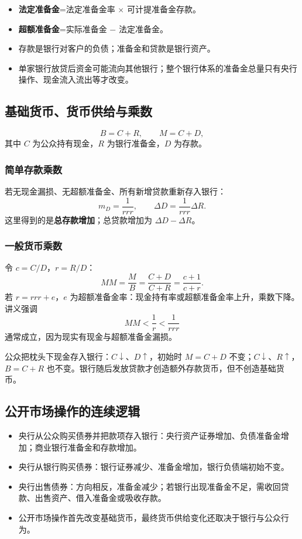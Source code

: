 \documentclass[UTF8,11pt,a4paper]{ctexart}
\newcommand{\term}[1]{\textbf{#1}}
\begin{document}
\begin{itemize}
  \item \term{法定准备金}=法定准备金率 $\times$ 可计提准备金存款。
  \item \term{超额准备金}=实际准备金 $-$ 法定准备金。
  \item 存款是银行对客户的负债；准备金和贷款是银行资产。
  \item 单家银行放贷后资金可能流向其他银行；整个银行体系的准备金总量只有央行操作、现金流入流出等才改变。
\end{itemize}

\subsection{基础货币、货币供给与乘数}
\[
B=C+R,
\qquad
M=C+D,
\]
其中 $C$ 为公众持有现金，$R$ 为银行准备金，$D$ 为存款。

\subsubsection{简单存款乘数}
若无现金漏损、无超额准备金、所有新增贷款重新存入银行：
\[
m_D=\frac{1}{rrr},
\qquad
\Delta D=\frac{1}{rrr}\Delta R.
\]
这里得到的是\term{总存款增加}；总贷款增加为 $\Delta D-\Delta R$。

\subsubsection{一般货币乘数}
令 $c=C/D$，$r=R/D$：
\[
MM=\frac{M}{B}=\frac{C+D}{C+R}=\frac{c+1}{c+r}.
\]
若 $r=rrr+e$，$e$ 为超额准备金率：现金持有率或超额准备金率上升，乘数下降。讲义强调
\[
MM<\frac{1}{r}<\frac{1}{rrr}
\]
通常成立，因为现实有现金与超额准备金漏损。

\begin{warningbox}
公众把枕头下现金存入银行：$C\downarrow$、$D\uparrow$，初始时 $M=C+D$ 不变；$C\downarrow$、$R\uparrow$，$B=C+R$ 也不变。银行随后发放贷款才创造额外存款货币，但不创造基础货币。
\end{warningbox}

\subsection{公开市场操作的连续逻辑}
\begin{itemize}
  \item 央行从公众购买债券并把款项存入银行：央行资产证券增加、负债准备金增加；商业银行准备金和存款增加。
  \item 央行从银行购买债券：银行证券减少、准备金增加，银行负债端初始不变。
  \item 央行出售债券：方向相反，准备金减少；若银行出现准备金不足，需收回贷款、出售资产、借入准备金或吸收存款。
  \item 公开市场操作首先改变基础货币，最终货币供给变化还取决于银行与公众行为。
\end{itemize}
\end{document}
